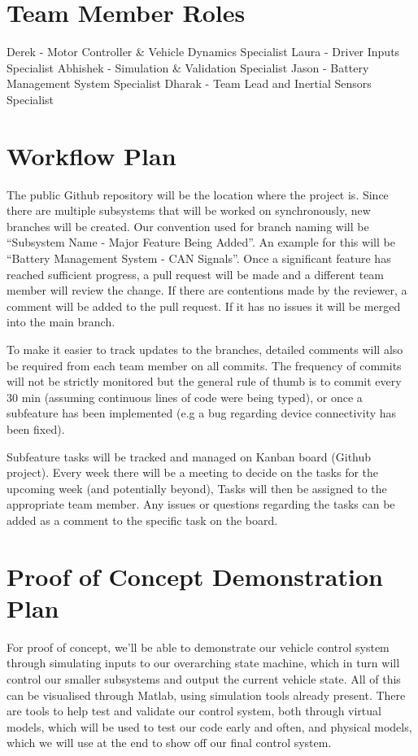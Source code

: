 \documentclass{article}
\begin{document}
\section{Team Member Roles}

Derek - Motor Controller & Vehicle Dynamics Specialist
Laura - Driver Inputs Specialist
Abhishek - Simulation & Validation Specialist
Jason - Battery Management System Specialist
Dharak - Team Lead and Inertial Sensors Specialist

\section{Workflow Plan}

The public Github repository will be the location where the project is.
Since there are multiple subsystems that will be worked on synchronously,
new branches will be created. Our convention used for branch naming will be
“Subsystem Name - Major Feature Being Added”. An example for this will be 
“Battery Management System - CAN Signals”. Once a significant feature has 
reached sufficient progress, a pull request will be made and a different 
team member will review the change. If there are contentions made by the 
reviewer, a comment will be added to the pull request. If it has no issues 
it will be merged into the main branch.


To make it easier to track updates to the branches, detailed comments will 
also be required from each team member on all commits. The frequency of 
commits will not be strictly monitored but the general rule of thumb is to
commit every 30 min (assuming continuous lines of code were being typed), 
or once a subfeature has been implemented (e.g a bug regarding device 
connectivity has been fixed). 

Subfeature tasks will be tracked and managed on Kanban board (Github 
project). Every week there will be a meeting to decide on the tasks for the
upcoming week (and potentially beyond), Tasks will then be assigned to the 
appropriate team member. Any issues or questions regarding the tasks can be 
added as a comment to the specific task on the board.

\section{Proof of Concept Demonstration Plan}

For proof of concept, we’ll be able to demonstrate our vehicle control 
system through simulating inputs to our overarching state machine, which in 
turn will control our smaller subsystems and output the current vehicle state. 
All of this can be visualised through Matlab, using simulation tools already 
present. There are tools to help test and validate our control system, both 
through virtual models, which will be used to test our code early and often, 
and physical models, which we will use at the end to show off our final 
control system.
\end{document}
